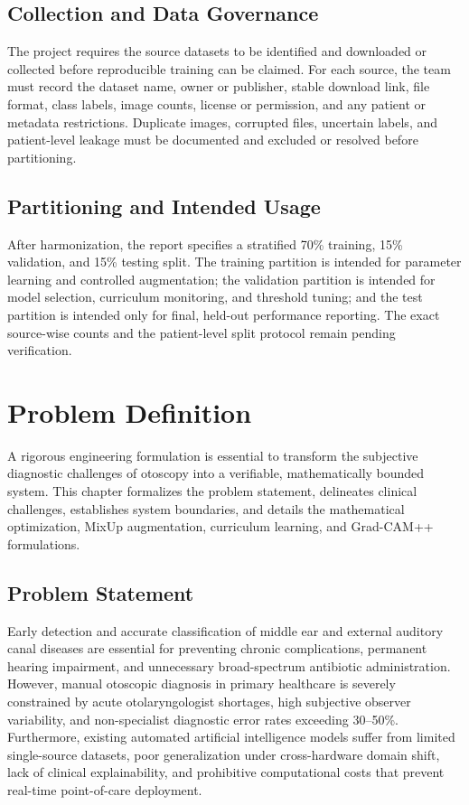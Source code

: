 \documentclass[12pt,a4paper]{report}
\begin{document}
\section{Collection and Data Governance}
The project requires the source datasets to be identified and downloaded or collected before reproducible training can be claimed. For each source, the team must record the dataset name, owner or publisher, stable download link, file format, class labels, image counts, license or permission, and any patient or metadata restrictions. Duplicate images, corrupted files, uncertain labels, and patient-level leakage must be documented and excluded or resolved before partitioning.

\section{Partitioning and Intended Usage}
After harmonization, the report specifies a stratified 70\% training, 15\% validation, and 15\% testing split. The training partition is intended for parameter learning and controlled augmentation; the validation partition is intended for model selection, curriculum monitoring, and threshold tuning; and the test partition is intended only for final, held-out performance reporting. The exact source-wise counts and the patient-level split protocol remain pending verification.

\chapter{Problem Definition}

A rigorous engineering formulation is essential to transform the subjective diagnostic challenges of otoscopy into a verifiable, mathematically bounded system. This chapter formalizes the problem statement, delineates clinical challenges, establishes system boundaries, and details the mathematical optimization, MixUp augmentation, curriculum learning, and Grad-CAM++ formulations.

\section{Problem Statement}
Early detection and accurate classification of middle ear and external auditory canal diseases are essential for preventing chronic complications, permanent hearing impairment, and unnecessary broad-spectrum antibiotic administration. However, manual otoscopic diagnosis in primary healthcare is severely constrained by acute otolaryngologist shortages, high subjective observer variability, and non-specialist diagnostic error rates exceeding 30--50\%. Furthermore, existing automated artificial intelligence models suffer from limited single-source datasets, poor generalization under cross-hardware domain shift, lack of clinical explainability, and prohibitive computational costs that prevent real-time point-of-care deployment.
\end{document}
